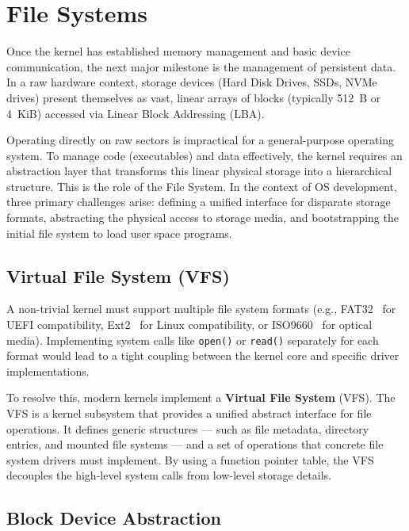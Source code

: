 \documentclass[a4paper,10pt,twoside]{report}
\theoremstyle{definition}
\begin{document}
\section{File Systems}
\label{sec:theory_fs}

Once the kernel has established memory management and basic device communication, the next major milestone is the management of persistent data. In a raw hardware context, storage devices (Hard Disk Drives, SSDs, NVMe drives) present themselves as vast, linear arrays of blocks (typically 512~B or 4~KiB) accessed via Linear Block Addressing (LBA).

Operating directly on raw sectors is impractical for a general-purpose operating system. To manage code (executables) and data effectively, the kernel requires an abstraction layer that transforms this linear physical storage into a hierarchical structure. This is the role of the File System. In the context of OS development, three primary challenges arise: defining a unified interface for disparate storage formats, abstracting the physical access to storage media, and bootstrapping the initial file system to load user space programs.

\subsection{Virtual File System (VFS)}

A non-trivial kernel must support multiple file system formats (e.g., FAT32~\cite{fat-spec} for UEFI compatibility, Ext2~\cite{ext2-spec} for Linux compatibility, or ISO9660~\cite{iso9660-spec} for optical media). Implementing system calls like \texttt{open()} or \texttt{read()} separately for each format would lead to a tight coupling between the kernel core and specific driver implementations.

To resolve this, modern kernels implement a \textbf{Virtual File System} (VFS). The VFS is a kernel subsystem that provides a unified abstract interface for file operations. It defines generic structures --- such as file metadata, directory entries, and mounted file systems --- and a set of operations that concrete file system drivers must implement. By using a function pointer table, the VFS decouples the high-level system calls from low-level storage details.

\subsection{Block Device Abstraction}
\end{document}
